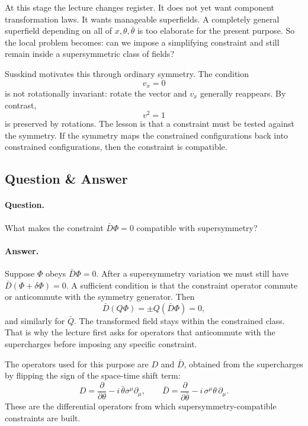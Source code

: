 At this stage the lecture changes register. It does not yet want component transformation laws. It wants manageable superfields. A completely general superfield depending on all of \(x,\theta,\bar\theta\) is too elaborate for the present purpose. So the local problem becomes: can we impose a simplifying constraint and still remain inside a supersymmetric class of fields?

Susskind motivates this through ordinary symmetry. The condition
\[
v_x=0
\]
is not rotationally invariant: rotate the vector and \(v_x\) generally reappears. By contrast,
\[
v^2=1
\]
is preserved by rotations. The lesson is that a constraint must be tested against the symmetry. If the symmetry maps the constrained configurations back into constrained configurations, then the constraint is compatible.

\subsection{Question \& Answer}

\paragraph{Question.} What makes the constraint \(\bar D\Phi=0\) compatible with supersymmetry?

\paragraph{Answer.} Suppose \(\Phi\) obeys \(\bar D\Phi=0\). After a supersymmetry variation we must still have \(\bar D(\Phi+\delta\Phi)=0\). A sufficient condition is that the constraint operator commute or anticommute with the symmetry generator. Then
\[
\bar D(Q\Phi)=\pm Q(\bar D\Phi)=0,
\]
and similarly for \(\bar Q\). The transformed field stays within the constrained class. That is why the lecture first asks for operators that anticommute with the supercharges before imposing any specific constraint.

The operators used for this purpose are \(D\) and \(\bar D\), obtained from the supercharges by flipping the sign of the space-time shift term:
\begin{equation}
D=\frac{\partial}{\partial\theta}-i\,\bar\theta\sigma^\mu\partial_\mu,
\qquad
\bar D=\frac{\partial}{\partial\bar\theta}-i\,\sigma^\mu\theta\,\partial_\mu.
\end{equation}
These are the differential operators from which supersymmetry-compatible constraints are built.

